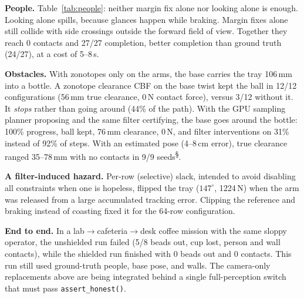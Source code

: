 \documentclass[10pt,twocolumn,letterpaper]{article}
\newcommand{\pre}{\textsuperscript{\S}}   %
\begin{document}
\textbf{People.} Table~\ref{tab:people}: neither margin fix alone nor looking alone is enough. Looking alone spills, because glances
happen while braking. Margin fixes alone still collide with side crossings outside the forward field of view. Together they reach
0 contacts and 27/27 completion, better completion than ground truth (24/27), at a cost of 5--8\,s.

\textbf{Obstacles.} With zonotopes only on the arms, the base carries the tray 106\,mm into a bottle. A zonotope clearance CBF on the base
twist kept the ball in 12/12 configurations (56\,mm true clearance, 0\,N contact force), versus 3/12 without it. It \emph{stops} rather than
going around (44\% of the path). With the GPU sampling planner proposing and the same filter certifying, the base goes around the bottle: 100\% progress, ball kept, 76\,mm clearance, 0\,N, and filter interventions on 31\% instead of 92\% of steps. With an estimated pose (4--8\,cm error), true clearance
ranged 35--78\,mm with no contacts in 9/9 seeds\pre.

\textbf{A filter-induced hazard.} Per-row (selective) slack, intended to avoid disabling all constraints when one is hopeless, flipped the
tray ($147^\circ$, 1224\,N) when the arm was released from a large accumulated tracking error. Clipping the reference and braking instead of
coasting fixed it for the 64-row configuration.

\textbf{End to end.} In a lab$\to$cafeteria$\to$desk coffee mission with the same sloppy operator, the unshielded run failed (5/8 beads
out, cup lost, person and wall contacts), while the shielded run finished with 0 beads out and 0 contacts. This run still used ground-truth
people, base pose, and walls. The camera-only replacements above are being integrated behind a single full-perception switch that must pass
\texttt{assert\_honest()}.
\end{document}

